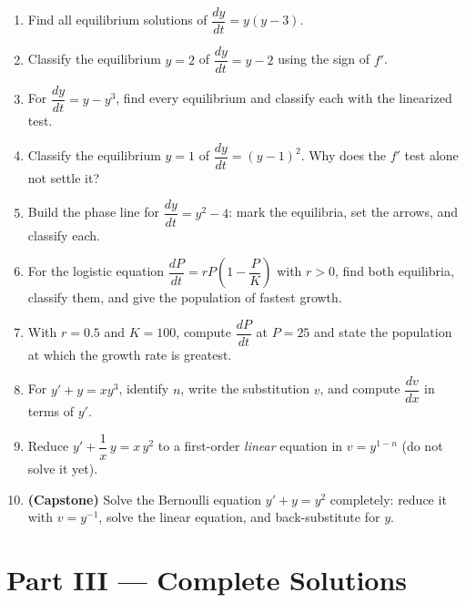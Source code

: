 \begin{enumerate}[leftmargin=2em]
    \item Find all equilibrium solutions of $\dfrac{dy}{dt} = y(y-3)$.

    \item Classify the equilibrium $y = 2$ of $\dfrac{dy}{dt} = y - 2$ using the
          sign of $f'$.

    \item For $\dfrac{dy}{dt} = y - y^{3}$, find every equilibrium and classify
          each with the linearized test.

    \item Classify the equilibrium $y = 1$ of $\dfrac{dy}{dt} = (y-1)^{2}$. Why
          does the $f'$ test alone not settle it?

    \item Build the phase line for $\dfrac{dy}{dt} = y^{2} - 4$: mark the
          equilibria, set the arrows, and classify each.

    \item For the logistic equation $\dfrac{dP}{dt} = rP\!\left(1-\dfrac{P}{K}\right)$
          with $r > 0$, find both equilibria, classify them, and give the
          population of fastest growth.

    \item With $r = 0.5$ and $K = 100$, compute $\dfrac{dP}{dt}$ at $P = 25$ and
          state the population at which the growth rate is greatest.

    \item For $y' + y = xy^{3}$, identify $n$, write the substitution $v$, and
          compute $\dfrac{dv}{dx}$ in terms of $y'$.

    \item Reduce $y' + \dfrac{1}{x}\,y = x\,y^{2}$ to a first-order \emph{linear}
          equation in $v = y^{1-n}$ (do not solve it yet).

    \item \textbf{(Capstone)} Solve the Bernoulli equation $y' + y = y^{2}$
          completely: reduce it with $v = y^{-1}$, solve the linear equation, and
          back-substitute for $y$.
\end{enumerate}

\clearpage
{}
{}
\section*{Part III --- Complete Solutions}

